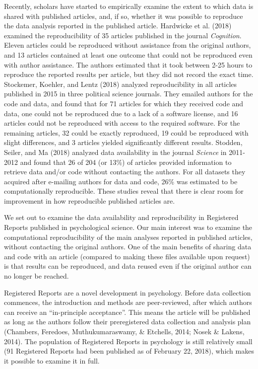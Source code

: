 \documentclass[,jou, a4paper,floatsintext]{apa6}
\begin{document}
Recently, scholars have started to empirically examine the extent to which data is shared with published articles, and, if so, whether it was possible to reproduce the data analysis reported in the published article. Hardwicke et al. (2018) examined the reproducibility of 35 articles published in the journal \emph{Cognition}. Eleven articles could be reproduced without assistance from the original authors, and 13 articles contained at least one outcome that could not be reproduced even with author assistance. The authors estimated that it took between 2-25 hours to reproduce the reported results per article, but they did not record the exact time. Stockemer, Koehler, and Lentz (2018) analyzed reproducibility in all articles published in 2015 in three political science journals. They emailed authors for the code and data, and found that for 71 articles for which they received code and data, one could not be reproduced due to a lack of a software license, and 16 articles could not be reproduced with access to the required software. For the remaining articles, 32 could be exactly reproduced, 19 could be reproduced with slight differences, and 3 articles yielded significantly different results. Stodden, Seiler, and Ma (2018) analyzed data availability in the journal \emph{Science} in 2011-2012 and found that 26 of 204 (or 13\%) of articles provided information to retrieve data and/or code without contacting the authors. For all datasets they acquired after e-mailing authors for data and code, 26\% was estimated to be computationally reproducible. These studies reveal that there is clear room for improvement in how reproducible published articles are.

We set out to examine the data availability and reproducibility in Registered Reports published in psychological science. Our main interest was to examine the computational reproducibility of the main analyses reported in published articles, without contacting the original authors. One of the main benefits of sharing data and code with an article (compared to making these files available upon request) is that results can be reproduced, and data reused even if the original author can no longer be reached.

Registered Reports are a novel development in psychology. Before data collection commences, the introduction and methods are peer-reviewed, after which authors can receive an \enquote{in-principle acceptance}. This means the article will be published as long as the authors follow their preregistered data collection and analysis plan (Chambers, Feredoes, Muthukumaraswamy, \& Etchells, 2014; Nosek \& Lakens, 2014). The population of Registered Reports in psychology is still relatively small (91 Registered Reports had been published as of February 22, 2018), which makes it possible to examine it in full.
\end{document}
